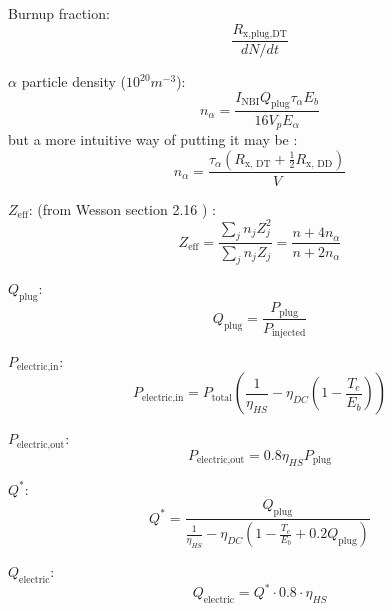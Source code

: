 Burnup fraction:
\begin{equation}
    \frac{R_{\text{x,plug,DT}}}{dN/dt}
\end{equation}

$\alpha$ particle density ($10^{20}m^{-3}$):
\begin{equation}
    n_{\alpha} = \frac{I_{\text{NBI}} Q_{\text{plug}} \tau_{\alpha} E_b}{16 V_p E_{\alpha}}
\end{equation} but a more intuitive way of putting it may be :
\begin{equation}
    n_{\alpha} = \frac{\tau_{\alpha} \left(R_{\text{x, DT}} + \frac{1}{2} R_{\text{x, DD}} \right)}{V}
\end{equation}

$Z_{\text{eff}}$: (from Wesson section 2.16 \cite{wesson_1987_419}) :
\begin{equation}
    Z_{\text{eff}} = \frac{\sum_j n_j Z_j^2}{\sum_j n_j Z_j} = \frac{n + 4 n_\alpha}{n + 2 n_\alpha}
\end{equation}

$Q_{\text{plug}}$:
\begin{equation}
    Q_{\text{plug}} = \frac{P_{\text{plug}}}{P_{\text{injected}}}
\end{equation}


$P_{\text{electric,in}}$:
\begin{equation}
    P_{\text{electric,in}} = P_{\text{total}}\left(\frac{1}{\eta_{HS}} - \eta_{DC}\left(1-\frac{T_e}{E_b}\right)\right)
\end{equation}

$P_{\text{electric,out}}$: 
\begin{equation}
    P_{\text{electric,out}} = 0.8\eta_{HS}P_{\text{plug}}
\end{equation}

$Q^{\ast}$: 
\begin{equation}
    Q^{\ast} = \frac{Q_{\text{plug}}}{\frac{1}{\eta_{HS}} - \eta_{DC}\left(1-\frac{T_e}{E_b}+0.2Q_{\text{plug}}\right)}
\end{equation}

$Q_{\text{electric}}$:
\begin{equation}
    Q_{\text{electric}} = Q^{\ast} \cdot 0.8 \cdot \eta_{HS}
\end{equation}

